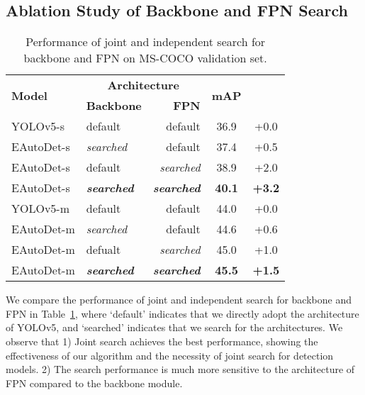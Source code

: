 \documentclass[letterpaper]{article} \usepackage{aaai22}  \usepackage{times}  \usepackage{helvet}  \usepackage{courier}  \usepackage[hyphens]{url}  \usepackage{graphicx} \urlstyle{rm} \def\UrlFont{\rm}  \usepackage{natbib}  \usepackage{caption} \DeclareCaptionStyle{ruled}{labelfont=normalfont,labelsep=colon,strut=off} \frenchspacing  \setlength{\pdfpagewidth}{8.5in}  \setlength{\pdfpageheight}{11in}
\begin{document}
\subsection{Ablation Study of Backbone and FPN Search}
\begin{table}[tb]
    \centering
\caption{Performance of joint and independent search for backbone and FPN on MS-COCO validation set. }
    \label{tab:backbonevsfpn}
\vspace{-8pt}
    \begin{tabular}{llrcc}
    \toprule
       \multirow{2}{*}{\textbf{Model}} & \multicolumn{2}{c}{\textbf{Architecture}} & \multirow{2}{*}{\textbf{mAP}} & \multirow{2}{*}{} \\
        \cmidrule(lr){2-3}
        &\textbf{Backbone} & \textbf{FPN} & & \\
    \midrule 
         YOLOv5-s    & default   &  default    & 36.9 & +0.0 \\ 
         EAutoDet-s & \emph{searched} & default & 37.4 & +0.5 \\
         EAutoDet-s & default & \emph{searched} & 38.9 & +2.0 \\
         EAutoDet-s & \textbf{\emph{searched}}  & \textbf{\emph{searched}}  & \textbf{40.1} & \textbf{+3.2} \\
         \midrule
         YOLOv5-m    & default   &  default    & 44.0 & +0.0  \\
         EAutoDet-m & \emph{searched} & default & 44.6 & +0.6 \\
         EAutoDet-m & defualt & \emph{searched}  & 45.0 & +1.0 \\
         EAutoDet-m & \textbf{\emph{searched}}  & \textbf{\emph{searched}}  & \textbf{45.5} & \textbf{+1.5} \\


    \bottomrule
    \end{tabular}
\end{table}
We compare the performance of joint and independent search for backbone and FPN in Table~\ref{tab:backbonevsfpn}, where `default' indicates that we directly adopt the architecture of YOLOv5, and `searched' indicates that we search for the architectures.
We observe that 
1) Joint search achieves the best performance, showing the effectiveness of our algorithm and the necessity of joint search for detection models.
2) The search performance is much more sensitive to the architecture of FPN compared to the backbone module.  
\end{document}
